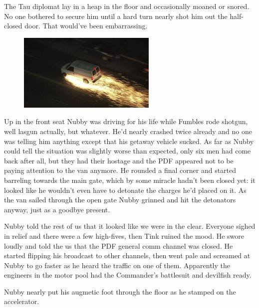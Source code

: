 The Tau diplomat lay in a heap in the floor and occasionally moaned or snored. 
No one bothered to secure him until a hard turn nearly shot him out the half-closed door. 
That would've been embarrassing.

\begin{figure}
	\begin{center}
		\includegraphics[width=\figwidth]{pics/10/67.png}
	\end{center}
\end{figure}
Up in the front seat Nubby was driving for his life while Fumbles rode shotgun, well lasgun actually, but whatever. 
He'd nearly crashed twice already and no one was telling him anything except that his getaway vehicle sucked. 
As far as Nubby could tell the situation was slightly worse than expected, only six men had come back after all, but they had their hostage and the PDF appeared not to be paying attention to the van anymore. 
He rounded a final corner and started barreling towards the main gate, which by some miracle hadn't been closed yet: 
it looked like he wouldn't even have to detonate the charges he'd placed on it. 
As the van sailed through the open gate Nubby grinned and hit the detonators anyway, just as a goodbye present.

Nubby told the rest of us that it looked like we were in the clear. 
Everyone sighed in relief and there were a few high-fives, then Tink ruined the mood. 
He swore loudly and told the us that the PDF general comm channel was closed. 
He started flipping his broadcast to other channels, then went pale and screamed at Nubby to go faster as he heard the traffic on one of them. 
Apparently the engineers in the motor pool had the Commander's battlesuit and devilfish ready.

Nubby nearly put his augmetic foot through the floor as he stamped on the accelerator.

